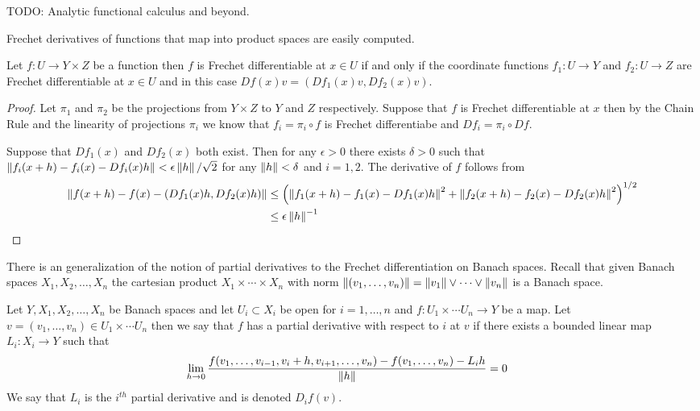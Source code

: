 TODO: Analytic functional calculus and beyond.

Frechet derivatives of functions that map into product spaces are easily computed.
\begin{prop}\label{FrechetDerivativeProductSpaces}Let $f : U \to Y \times Z$ be a function then $f$ is Frechet differentiable at $x \in U$ if and only if the coordinate functions $f_1 : U \to Y$ and
$f_2 : U \to Z$ are Frechet differentiable at $x \in U$ and in this case $Df(x)v = (Df_1(x)v, Df_2(x)v)$.
\end{prop}
\begin{proof}
Let $\pi_1$ and $\pi_2$ be the projections from $Y \times Z$ to $Y$ and $Z$ respectively.  Suppose that $f$ is Frechet differentiable at $x$ then by the Chain Rule and the linearity of projections $\pi_i$ we know that $f_i = \pi_i \circ f$ is Frechet differentiabe and $D f_i = \pi_i \circ Df$.

Suppose that $D f_1(x)$ and $D f_2(x)$ both exist.  Then for any $\epsilon>0$ there exists $\delta>0$ such that $\left \lVert f_i(x+h) - f_i(x) - Df_i(x) h \right \rVert < \epsilon \left \lVert h \right \rVert/\sqrt{2}$ for any $\left \lVert h \right \rVert < \delta$ and $i=1,2$.   The derivative of $f$ follows from 
\begin{align*}
\left \lVert f(x+h) - f(x) - (Df_1(x) h, Df_2(x) h) \right \rVert &\leq \left(\left \lVert f_1(x+h) - f_1(x) - Df_1(x) h \right \rVert^2 +  \left \lVert f_2(x+h) - f_2(x) - Df_2(x) h \right \rVert^2 \right)^{1/2} \\
&\leq \epsilon \left \lVert h \right \rVert^{-1}
\end{align*}
\end{proof}

There is an generalization of the notion of partial derivatives to the Frechet differentiation on Banach spaces.
Recall that given Banach spaces $X_1, X_2, \dotsc, X_n$ the cartesian product $X_1 \times \dotsb \times X_n$ with norm
$\left \lVert (v_1, \dotsc, v_n) \right \rVert = \left \lVert v_1 \right \rVert \vee \dotsb \vee \left \lVert v_n \right \rVert$ is a Banach space.  
\begin{defn}Let $Y,X_1, X_2, \dotsc, X_n$ be Banach spaces and let $U_i \subset X_i$ be open for $i=1, \dotsc, n$ and $f : U_1 \times \dotsb U_n \to Y$ be a map.  Let 
$v=(v_1, \dotsc, v_n) \in U_1 \times \dotsb U_n$ then we say that $f$ has a partial derivative with respect to $i$ at $v$ if there exists a bounded linear map $L_i : X_i \to Y$ 
such that 
\begin{align*}
\lim_{h \to 0} \frac{f(v_1, \dotsc, v_{i-1}, v_i + h, v_{i+1}, \dotsc, v_n) - f(v_1, \dotsc, v_n) - L_i h}{\left \lVert h \right \rVert} &= 0
\end{align*}
We say that $L_i$ is the $i^{th}$ partial derivative and is denoted $D_i f (v)$.
\end{defn}

